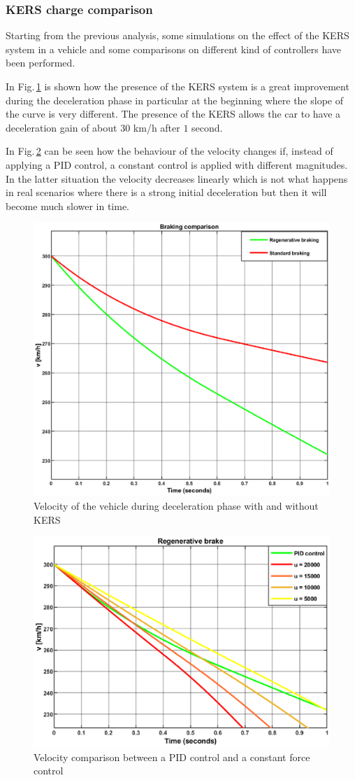 \documentclass[11pt]{article}
\begin{document}
\subsubsection{KERS charge comparison}

Starting from the previous analysis, some simulations on the effect of the KERS system in a vehicle and some comparisons on different kind of controllers have been performed.

In Fig.\,\ref{fig: Comparison_KERS_brake} is shown how the presence of the KERS system is a great improvement during the deceleration phase in particular at the beginning where the slope of the curve is very different. The presence of the KERS allows the car to have a deceleration gain of about $30$ km/h after $1$ second.

In Fig.\,\ref{fig: Comparison_KERS_brake_Control} can be seen how the behaviour of the velocity changes if, instead of applying a PID control, a constant control is applied with different magnitudes. In the latter situation the velocity decreases linearly which is not what happens in real scenarios where there is a strong initial deceleration but then it will become much slower in time.

\begin{figure}[H]
\centering
\includegraphics[width=.6\textwidth]{Images/Results_Dynamics/Charge_comparison/brake_kers_vs_nokers.eps}
\caption{Velocity of the vehicle during deceleration phase with and without KERS}
\label{fig: Comparison_KERS_brake}
\end{figure}

\begin{figure}[H]
\centering
\includegraphics[width=.6\textwidth]{Images/Results_Dynamics/Charge_comparison/regenerative_brake_constantforce.eps}
\caption{Velocity comparison between a PID control and a constant force control}
\label{fig: Comparison_KERS_brake_Control}
\end{figure}
\end{document}

